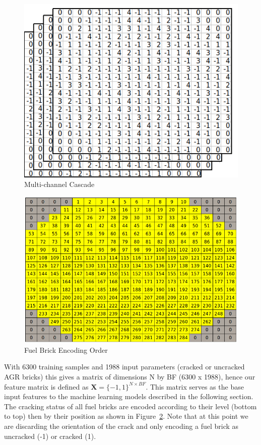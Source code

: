 \begin{figure}[t]
	\centering
	\includegraphics[scale=0.45]{Figures/InputCascade.png}
	\caption{Multi-channel Cascade}
	\label{fig:cascade}
\end{figure}

\begin{figure}[t]
	\centering
	\includegraphics[scale=0.35]{Figures/fuel_channel_numbers.png}
	\caption{Fuel Brick Encoding Order}
	\label{fig:order}
\end{figure}


\noindent
With 6300 training samples and 1988 input parameters (cracked or uncracked AGR bricks) this gives a matrix of dimensions N by BF (6300 x 1988), hence our feature matrix is defined as $\textbf{X} = \{-1, 1\}^{N \times BF}$. This matrix serves as the base input features to the machine learning models described in the following section. The cracking status of all fuel bricks are encoded according to their level (bottom to top) then by their position as shown in Figure~\ref{fig:order}. Note that at this point we are discarding the orientation of the crack and only encoding a fuel brick as uncracked (-1) or cracked (1).
\\


